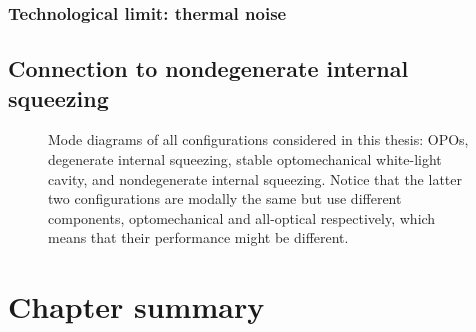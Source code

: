 \subsubsection{Technological limit: thermal noise}


\subsection{Connection to nondegenerate internal squeezing}

\begin{figure}
	\centering
	\caption{Mode diagrams of all configurations considered in this thesis: OPOs, degenerate internal squeezing, stable optomechanical white-light cavity, and nondegenerate internal squeezing. Notice that the latter two configurations are modally the same but use different components, optomechanical and all-optical respectively, which means that their performance might be different.}
	\label{fig:}
\end{figure}



\section{Chapter summary}



